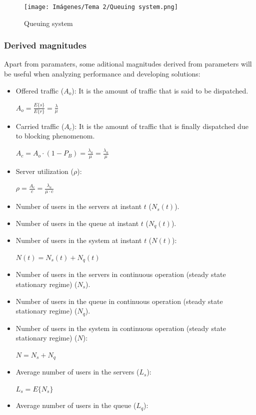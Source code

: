 \documentclass[
	12pt,
	twoside
]{book}
\begin{document}
\begin{figure}[H]
	\centering
	\texttt{[image: Imágenes/Tema 2/Queuing system.png]}
	\caption{
		\label{fig:unit2_qsystem}
		Queuing system
	}
\end{figure}

\subsubsection{Derived magnitudes}

Apart from paramaters, some aditional magnitudes derived from parameters will be useful when analyzing performance and developing solutions:

\begin{itemize}
	\item {
		Offered traffic ($A_o$): It is the amount of traffic that is said to be dispatched.

		$ A_o = \frac {E\{s\}} {E\{r\}} = \frac {\lambda} {\mu}$
	}
	\item {
		Carried traffic ($A_c$): It is the amount of traffic that is finally dispatched due to blocking phenomenom.

		$ A_c = A_o \cdot ( 1 - P_B ) = \frac {\lambda_a} {\mu} = \frac {\lambda_a} {\mu} $
	}
	\item {
		Server utilization ($\rho$):

		$ \rho = \frac {A_c} {c} = \frac {\lambda_a} {\mu \cdot c} $
	}
	\item Number of users in the servers at instant $t$ ($N_s(t)$).
	\item Number of users in the queue at instant $t$ ($N_q(t)$).
	\item {
		Number of users in the system at instant $t$ ($N(t)$):

		$ N(t) = N_s(t) + N_q(t) $
	}
	\item Number of users in the servers in continuous operation (steady state stationary regime) ($N_s$).
	\item Number of users in the queue in continuous operation (steady state stationary regime) ($N_q$).
	\item {
		Number of users in the system in continuous operation (steady state stationary regime) ($N$):

		$ N = N_s + N_q $
	}
	\item {
		Average number of users in the servers ($L_s$):

		$ L_s = E\{N_s\} $
	}
	\item {
		Average number of users in the queue ($L_q$):

}
\end{itemize}
\end{document}
